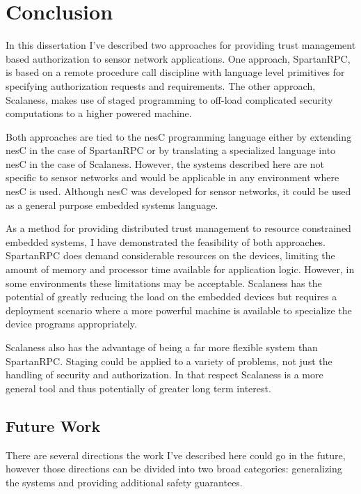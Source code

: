 
\chapter{Conclusion}
\label{chapter-conclusion}


In this dissertation I've described two approaches for providing trust management based
authorization to sensor network applications. One approach, SpartanRPC, is based on a remote
procedure call discipline with language level primitives for specifying authorization requests
and requirements. The other approach, Scalaness, makes use of staged programming to off-load
complicated security computations to a higher powered machine.

Both approaches are tied to the nesC programming language either by extending nesC in the case
of SpartanRPC or by translating a specialized language into nesC in the case of Scalaness.
However, the systems described here are not specific to sensor networks and would be applicable
in any environment where nesC is used. Although nesC was developed for sensor networks, it could
be used as a general purpose embedded systems language.

As a method for providing distributed trust management to resource constrained embedded systems,
I have demonstrated the feasibility of both approaches. SpartanRPC does demand considerable
resources on the devices, limiting the amount of memory and processor time available for
application logic. However, in some environments these limitations may be acceptable. Scalaness
has the potential of greatly reducing the load on the embedded devices but requires a deployment
scenario where a more powerful machine is available to specialize the device programs
appropriately.

Scalaness also has the advantage of being a far more flexible system than SpartanRPC. Staging
could be applied to a variety of problems, not just the handling of security and authorization.
In that respect Scalaness is a more general tool and thus potentially of greater long term
interest.

\section{Future Work}
\label{section-future-work}

There are several directions the work I've described here could go in the future, however those
directions can be divided into two broad categories: generalizing the systems and providing
additional safety guarantees.

